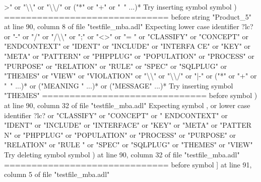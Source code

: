 {  >" or "\textbackslash{}\textbackslash{}" or "\textbackslash{}\textbackslash{}/" or ("*" or "+" or "~" ...)*\newline
  Try inserting symbol symbol )\newline
  \newline
  ==============================\newline
  \newline
  before string "Product\_5" at line 90, column 8 of file "testfile\_mba.adl"\newline
  Expecting lower case identifier ?lc? or "-" or "/" or "/\textbackslash{}\textbackslash{}" or ";" or "<>" or "=\newline
  " or "CLASSIFY" or "CONCEPT" or "ENDCONTEXT" or "IDENT" or "INCLUDE" or "INTERFA\newline
  CE" or "KEY" or "META" or "PATTERN" or "PHPPLUG" or "POPULATION" or "PROCESS" or\newline
   "PURPOSE" or "RELATION" or "RULE" or "SPEC" or "SQLPLUG" or "THEMES" or "VIEW"\newline
  or "VIOLATION" or "\textbackslash{}\textbackslash{}" or "\textbackslash{}\textbackslash{}/" or "|-" or ("*" or "+" or "~" ...)* or ("MEANING\newline
  " ...)* or ("MESSAGE" ...)*\newline
  Try inserting symbol "THEMES"\newline
  \newline
  ==============================\newline
  \newline
  before symbol ) at line 90, column 32 of file "testfile\_mba.adl"\newline
  Expecting symbol , or lower case identifier ?lc? or "CLASSIFY" or "CONCEPT" or "\newline
  ENDCONTEXT" or "IDENT" or "INCLUDE" or "INTERFACE" or "KEY" or "META" or "PATTER\newline
  N" or "PHPPLUG" or "POPULATION" or "PROCESS" or "PURPOSE" or "RELATION" or "RULE\newline
  " or "SPEC" or "SQLPLUG" or "THEMES" or "VIEW"\newline
  Try deleting symbol symbol ) at line 90, column 32 of file "testfile\_mba.adl"\newline
  \newline
  ==============================\newline
  \newline
  before symbol ] at line 91, column 5 of file "testfile\_mba.adl"\newline
}
